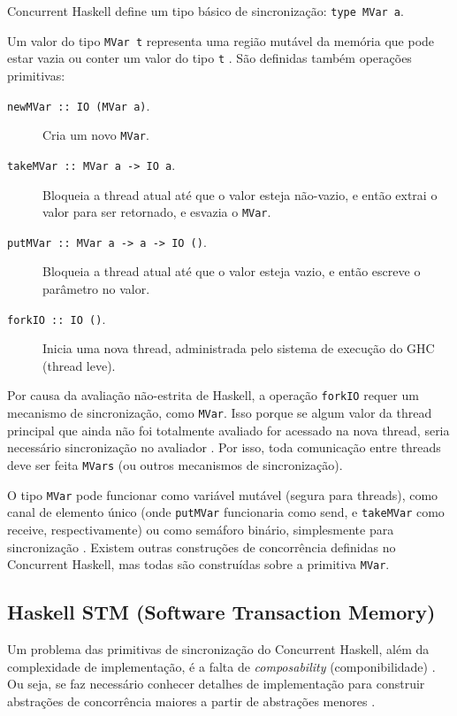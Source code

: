 \documentclass[a4paper,12pt,oldfontcommands]{abntex2}
\begin{document}
Concurrent Haskell define um tipo básico de sincronização: \texttt{type MVar a}.

Um valor do tipo \texttt{MVar t} representa uma região mutável da memória que pode estar vazia ou conter um valor do tipo \texttt{t} \cite{jones1996concurrent}. São definidas também operações primitivas:

\begin{description}
    \item [\texttt{newMVar :: IO (MVar a)}.] Cria um novo \texttt{MVar}.
    \item [\texttt{takeMVar :: MVar a -> IO a}.] Bloqueia a thread atual até que o valor esteja não-vazio, e então extrai o valor para ser retornado, e esvazia o \texttt{MVar}.
    \item [\texttt{putMVar :: MVar a -> a -> IO ()}.] Bloqueia a thread atual até que o valor esteja vazio, e então escreve o parâmetro no valor.
    \item [\texttt{forkIO :: IO ()}.] Inicia uma nova thread, administrada pelo sistema de execução do GHC (thread leve).
\end{description}

Por causa da avaliação não-estrita de Haskell, a operação \texttt{forkIO} requer um mecanismo de sincronização, como \texttt{MVar}. Isso porque se algum valor da thread principal que ainda não foi totalmente avaliado for acessado na nova thread, seria necessário sincronização no avaliador \cite{jones1996concurrent}. Por isso, toda comunicação entre threads deve ser feita \texttt{MVars} (ou outros mecanismos de sincronização).

O tipo \texttt{MVar} pode funcionar como variável mutável (segura para threads), como canal de elemento único (onde \texttt{putMVar} funcionaria como send, e \texttt{takeMVar} como receive, respectivamente) ou como semáforo binário, simplesmente para sincronização \cite{jones1996concurrent}.
Existem outras construções de concorrência definidas no Concurrent Haskell, mas todas são construídas sobre a primitiva \texttt{MVar}.

\subsection{Haskell STM (Software Transaction Memory)}

Um problema das primitivas de sincronização do Concurrent Haskell, além da complexidade de implementação, é a falta de \textit{composability} (componibilidade) \cite{harris2005composable}. Ou seja, se faz necessário conhecer detalhes de implementação para construir abstrações de concorrência maiores a partir de abstrações menores \cite{harris2005composable}.
\end{document}
